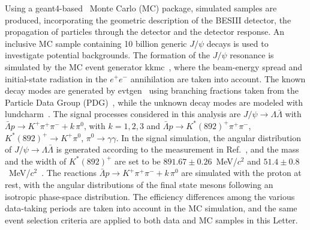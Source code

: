 \documentclass[prd,aps,reprint,noeprint,superscriptaddress,amsmath, amssymb]{revtex4-1}
\begin{document}
Using a {\sc geant4}-based~\cite{G42002iii} Monte Carlo (MC) package,
simulated samples are produced, incorporating the geometric description of the BESIII detector,
the propagation of particles through the detector and the detector response.
An inclusive MC sample containing 10 billion generic $J/\psi$ decays is used to investigate potential backgrounds.
The formation of the $J/\psi$ resonance is simulated by the MC event generator {\sc kkmc}~\cite{Jadach2001},
where the beam-energy spread and initial-state radiation in the $e^+ e^-$ annihilation are taken into account.
The known decay modes are generated by {\sc evtgen}~\cite{Lange2001,*Ping2008} using branching fractions taken from
the Particle Data Group (PDG)~\cite{PDG}, while the unknown decay modes are modeled with {\sc lundcharm}~\cite{Chen2000,*Yang2014a}.
The signal processes considered in this analysis are $J/\psi \to \Lambda \bar{\Lambda}$ with $\bar{\Lambda} p \to K^{+}\pi^{+}\pi^{-} + k\,\pi^{0}$, with $k=1,2,3$
and $\bar{\Lambda} p \to K^{*}(892)^{+}\pi^{+}\pi^{-}$, $K^{*}(892)^{+}\to K^+ \pi^0$, $\pi^0\to \gamma \gamma$.
In the signal simulation, the angular distribution of $J/\psi\to\Lambda\bar{\Lambda}$ is generated according to the measurement in Ref.~\cite{BESIII:2022qax}, and the mass and the width of $K^{*}(892)^{+}$ are set to be $891.67\pm0.26$~MeV/$c^2$ and $51.4\pm0.8$~MeV/$c^2$~\cite{PDG}.
The reactions $\bar{\Lambda}p\to  K^{+}\pi^{+}\pi^{-} + k\,\pi^{0}$ are simulated with the proton at rest,
with the angular distributions of the final state mesons following an isotropic phase-space distribution. The efficiency differences among the various data-taking periods are taken into account in the MC simulation, and the same event selection criteria are applied to both data and MC samples in this Letter.
\end{document}
